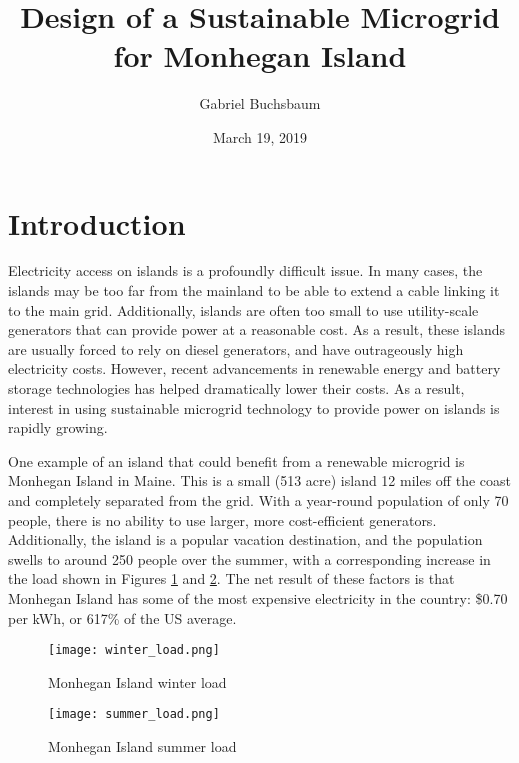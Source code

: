 \documentclass{article}
\title{Design of a Sustainable Microgrid for Monhegan Island}
\author{Gabriel Buchsbaum}
\date{March 19, 2019}
\begin{document}
\maketitle

\section{Introduction}

Electricity access on islands is a profoundly difficult issue.  In many cases, the islands may be too far from the mainland to be able to extend a cable linking it to the main grid.  Additionally, islands are often too small to use utility-scale generators that can provide power at a reasonable cost.  As a result, these islands are usually forced to rely on diesel generators, and have outrageously high electricity costs.  However, recent advancements in renewable energy and battery storage technologies has helped dramatically lower their costs.  As a result, interest in using sustainable microgrid technology to provide power on islands is rapidly growing.

One example of an island that could benefit from a renewable microgrid is Monhegan Island in Maine.  This is a small (513 acre) island 12 miles off the coast and completely separated from the grid.  With a year-round population of only 70 people, there is no ability to use larger, more cost-efficient generators.  Additionally, the island is a popular vacation destination, and the population swells to around 250 people over the summer, with a corresponding increase in the load shown in Figures \ref{fig:winter_load} and \ref{fig:summer_load}.  The net result of these factors is that Monhegan Island has some of the most expensive electricity in the country: \$0.70 per kWh, or 617\% of the US average.\cite{NE_Energy_Reports}

\begin{figure}
\begin{center}
\texttt{[image: winter\_load.png]}
\caption{Monhegan Island winter load \cite{Monhegan_Presentation}}
\label{fig:winter_load}
\end{center}
\end{figure}

\begin{figure}
\begin{center}
\texttt{[image: summer\_load.png]}
\caption{Monhegan Island summer load \cite{Monhegan_Presentation}}
\label{fig:summer_load}
\end{center}
\end{figure}
\end{document}
